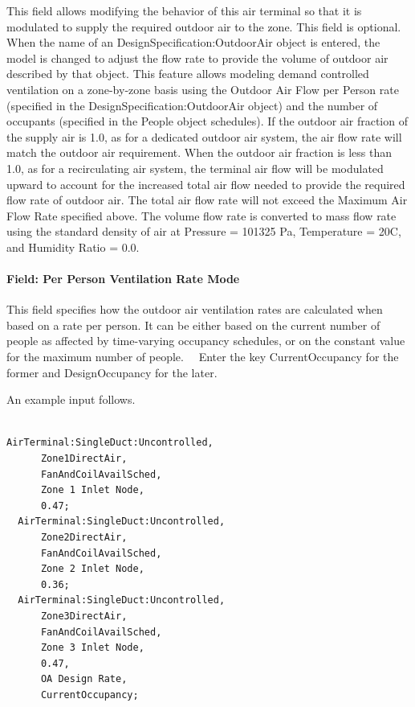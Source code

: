 This field allows modifying the behavior of this air terminal so that it is modulated to supply the required outdoor air to the zone.  This field is optional. When the name of an DesignSpecification:OutdoorAir object is entered, the model is changed to adjust the flow rate to provide the volume of outdoor air described by that object.  This feature allows modeling demand controlled ventilation on a zone-by-zone basis using the Outdoor Air Flow per Person rate (specified in the DesignSpecification:OutdoorAir object) and the number of occupants (specified in the People object schedules).  If the outdoor air fraction of the supply air is 1.0, as for a dedicated outdoor air system, the air flow rate will match the outdoor air requirement.  When the outdoor air fraction is less than 1.0, as for a recirculating air system, the terminal air flow will be modulated upward to account for the increased total air flow needed to provide the required flow rate of outdoor air.   The total air flow rate will not exceed the Maximum Air Flow Rate specified above. The volume flow rate is converted to mass flow rate using the standard density of air at Pressure = 101325 Pa, Temperature = 20C, and Humidity Ratio = 0.0.

\paragraph{Field: Per Person Ventilation Rate Mode}\label{field-per-person-ventilation-rate-mode}

This field specifies how the outdoor air ventilation rates are calculated when based on a rate per person. It can be either based on the current number of people as affected by time-varying occupancy schedules, or on the constant value for the maximum number of people.~~ Enter the key CurrentOccupancy for the former and DesignOccupancy for the later.

An example input follows.

\begin{lstlisting}

AirTerminal:SingleDuct:Uncontrolled,
      Zone1DirectAir,
      FanAndCoilAvailSched,
      Zone 1 Inlet Node,
      0.47;
  AirTerminal:SingleDuct:Uncontrolled,
      Zone2DirectAir,
      FanAndCoilAvailSched,
      Zone 2 Inlet Node,
      0.36;
  AirTerminal:SingleDuct:Uncontrolled,
      Zone3DirectAir,
      FanAndCoilAvailSched,
      Zone 3 Inlet Node,
      0.47,
      OA Design Rate,
      CurrentOccupancy;
\end{lstlisting}

